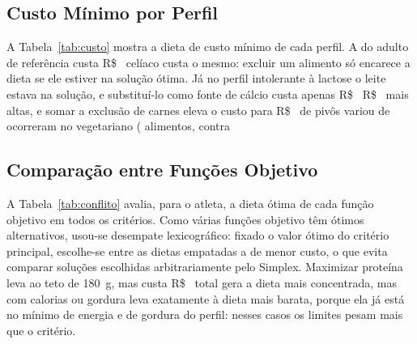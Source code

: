 \documentclass[12pt]{article}
\begin{document}
\subsection{Custo Mínimo por Perfil}

A Tabela~\ref{tab:custo} mostra a dieta de custo mínimo de cada perfil. A do adulto de
referência custa R\$~%
celíaco custa o mesmo: excluir um alimento só encarece a dieta se ele estiver na
solução ótima. Já no perfil intolerante à lactose o leite estava na solução, e substituí-lo como
fonte de cálcio custa apenas R\$~%
R\$~%
mais altas, e somar a exclusão de carnes eleva o custo para R\$~%
de pivôs variou de %
ocorreram no vegetariano (%
alimentos, contra %

\begin{table}[ht]
\centering
\caption{Dieta de custo mínimo por perfil (modelo linear).}\label{tab:custo}
\footnotesize

\end{table}

\subsection{Comparação entre Funções Objetivo}

A Tabela~\ref{tab:conflito} avalia, para o atleta, a dieta ótima de cada função
objetivo em todos os critérios. Como várias funções objetivo têm ótimos alternativos,
usou-se desempate lexicográfico: fixado o valor ótimo do critério principal, escolhe-se
entre as dietas empatadas a de menor custo, o que evita comparar soluções escolhidas
arbitrariamente pelo Simplex. Maximizar proteína leva ao teto de 180~g, mas custa
R\$~%
total gera a dieta mais concentrada, mas com %
calorias ou gordura leva exatamente à dieta mais barata, porque ela já está no mínimo de
energia e de gordura do perfil: nesses casos os limites pesam mais que o critério.

\begin{table}[ht]
\centering
\caption{Atleta: dieta ótima de cada função objetivo avaliada em todos os critérios.}\label{tab:conflito}
\footnotesize

\end{table}
\end{document}

